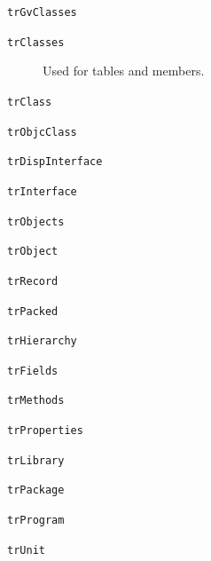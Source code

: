 \documentclass{report}
\begin{document}
\begin{list}{}
\begin{description}
\item[\texttt{trGvClasses}] \label{PasDoc_Languages-trGvClasses}
\index{}
 
\item[\texttt{trClasses}] \label{PasDoc_Languages-trClasses}
\index{}
Used for tables and members.
\item[\texttt{trClass}] \label{PasDoc_Languages-trClass}
\index{}
 
\item[\texttt{trObjcClass}] \label{PasDoc_Languages-trObjcClass}
\index{}
 
\item[\texttt{trDispInterface}] \label{PasDoc_Languages-trDispInterface}
\index{}
 
\item[\texttt{trInterface}] \label{PasDoc_Languages-trInterface}
\index{}
 
\item[\texttt{trObjects}] \label{PasDoc_Languages-trObjects}
\index{}
 
\item[\texttt{trObject}] \label{PasDoc_Languages-trObject}
\index{}
 
\item[\texttt{trRecord}] \label{PasDoc_Languages-trRecord}
\index{}
 
\item[\texttt{trPacked}] \label{PasDoc_Languages-trPacked}
\index{}
 
\item[\texttt{trHierarchy}] \label{PasDoc_Languages-trHierarchy}
\index{}
 
\item[\texttt{trFields}] \label{PasDoc_Languages-trFields}
\index{}
 
\item[\texttt{trMethods}] \label{PasDoc_Languages-trMethods}
\index{}
 
\item[\texttt{trProperties}] \label{PasDoc_Languages-trProperties}
\index{}
 
\item[\texttt{trLibrary}] \label{PasDoc_Languages-trLibrary}
\index{}
 
\item[\texttt{trPackage}] \label{PasDoc_Languages-trPackage}
\index{}
 
\item[\texttt{trProgram}] \label{PasDoc_Languages-trProgram}
\index{}
 
\item[\texttt{trUnit}] \label{PasDoc_Languages-trUnit}
\index{}
 

\end{description}
\end{list}
\end{document}
